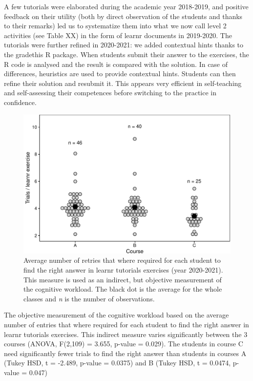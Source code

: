 \documentclass[
]{article}
\begin{document}
A few tutorials were elaborated during the academic year 2018-2019, and
positive feedback on their utility (both by direct observation of the
students and thanks to their remarks) led us to systematize them into
what we now call level 2 activities (see Table XX) in the form of learnr
documents in 2019-2020. The tutorials were further refined in 2020-2021:
we added contextual hints thanks to the gradethis R package. When
students submit their answer to the exercises, the R code is analysed
and the result is compared with the solution. In case of differences,
heuristics are used to provide contextual hints. Students can then
refine their solution and resubmit it. This appears very efficient in
self-teaching and self-assessing their competences before switching to
the practice in confidence.

\begin{figure}
\centering
\includegraphics{teaching_data_science_files/figure-latex/fig_learn_trials-1.pdf}
\caption{Average number of retries that where required for each student
to find the right answer in learnr tutorials exercises (year 2020-2021).
This measure is used as an indirect, but objective measurement of the
cognitive workload. The black dot is the average for the whole classes
and \emph{n} is the number of observations.}
\end{figure}

The objective measurement of the cognitive workload based on the average
number of entries that where required for each student to find the right
answer in learnr tutorials exercises. This indirect measure varies
significantly between the 3 courses (ANOVA, F(2,109) = 3.655, p-value =
0.029). The students in course C need significantly fewer trials to find
the right answer than students in courses A (Tukey HSD, t = -2.489,
p-value = 0.0375) and B (Tukey HSD, t = 0.0474, p-value = 0.047)
\end{document}
